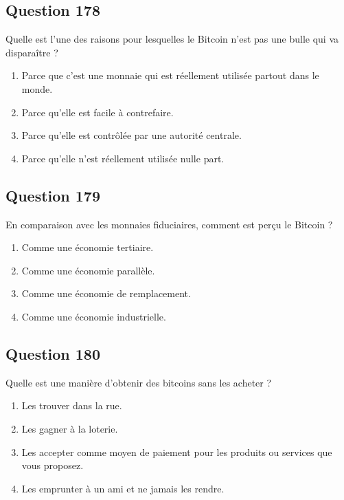 \documentclass[12pt,a4paper]{article}
\begin{document}
\bigskip


\subsection*{Question 178}
Quelle est l'une des raisons pour lesquelles le Bitcoin n'est pas une bulle qui va disparaître ?

\begin{enumerate}[label=\Alph*., leftmargin=*]
\item Parce que c'est une monnaie qui est réellement utilisée partout dans le monde.
\item Parce qu'elle est facile à contrefaire.
\item Parce qu'elle est contrôlée par une autorité centrale.
\item Parce qu'elle n'est réellement utilisée nulle part.
\end{enumerate}

\bigskip


\subsection*{Question 179}
En comparaison avec les monnaies fiduciaires, comment est perçu le Bitcoin ?

\begin{enumerate}[label=\Alph*., leftmargin=*]
\item Comme une économie tertiaire.
\item Comme une économie parallèle.
\item Comme une économie de remplacement.
\item Comme une économie industrielle.
\end{enumerate}

\bigskip


\subsection*{Question 180}
Quelle est une manière d'obtenir des bitcoins sans les acheter ?

\begin{enumerate}[label=\Alph*., leftmargin=*]
\item Les trouver dans la rue.
\item Les gagner à la loterie.
\item Les accepter comme moyen de paiement pour les produits ou services que vous proposez.
\item Les emprunter à un ami et ne jamais les rendre.
\end{enumerate}
\end{document}
